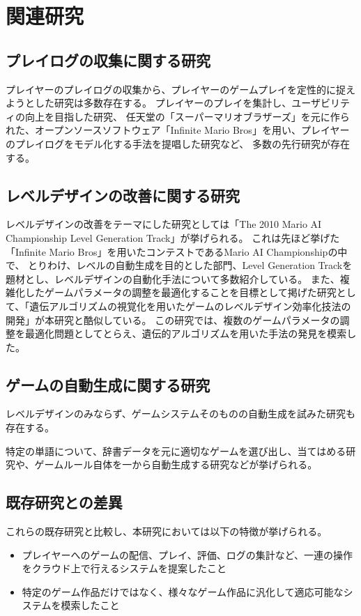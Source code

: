 \chapter{関連研究}
\section{プレイログの収集に関する研究}
プレイヤーのプレイログの収集から、プレイヤーのゲームプレイを定性的に捉えようとした研究は多数存在する。
プレイヤーのプレイを集計し、ユーザビリティの向上を目指した研究\cite{metrics}\cite{usability}、
任天堂の「スーパーマリオブラザーズ」を元に作られた、オープンソースソフトウェア「Infinite Mario Bros」\cite{mario}を用い、プレイヤーのプレイログをモデル化する手法を提唱した研究\cite{model}\cite{optimization}など、
多数の先行研究が存在する。

\section{レベルデザインの改善に関する研究}
レベルデザインの改善をテーマにした研究としては「The 2010 Mario AI Championship Level Generation Track」\cite{level}が挙げられる。
これは先ほど挙げた「Infinite Mario Bros」を用いたコンテストであるMario AI Championship\cite{champion}の中で、
とりわけ、レベルの自動生成を目的とした部門、Level Generation Trackを題材とし、レベルデザインの自動化手法について多数紹介している。
また、複雑化したゲームパラメータの調整を最適化することを目標として掲げた研究として、「遺伝アルゴリズムの視覚化を用いたゲームのレベルデザイン効率化技法の開発」\cite{ga}が本研究と酷似している。
この研究では、複数のゲームパラメータの調整を最適化問題としてとらえ、遺伝的アルゴリズムを用いた手法の発見を模索した。

\section{ゲームの自動生成に関する研究}
レベルデザインのみならず、ゲームシステムそのものの自動生成を試みた研究も存在する。

特定の単語について、辞書データを元に適切なゲームを選び出し、当てはめる研究\cite{auto}や、ゲームルール自体を一から自動生成する研究\cite{gamedesign}などが挙げられる。


\section{既存研究との差異}
これらの既存研究と比較し、本研究においては以下の特徴が挙げられる。

\begin{itemize}
  \item プレイヤーへのゲームの配信、プレイ、評価、ログの集計など、一連の操作をクラウド上で行えるシステムを提案したこと
  \item 特定のゲーム作品だけではなく、様々なゲーム作品に汎化して適応可能なシステムを模索したこと
\end{itemize}
